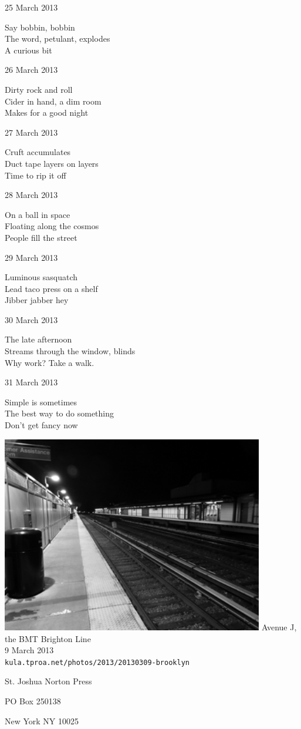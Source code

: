 \documentclass[12pt]{article}
\begin{document}
25 March 2013

Say bobbin, bobbin \\
The word, petulant, explodes \\
A curious bit

26 March 2013

Dirty rock and roll \\
Cider in hand, a dim room \\
Makes for a good night

27 March 2013

Cruft accumulates \\
Duct tape layers on layers \\
Time to rip it off

28 March 2013

On a ball in space \\
Floating along the cosmos \\
People fill the street

29 March 2013

Luminous sasquatch \\
Lead taco press on a shelf \\
Jibber jabber hey

30 March 2013

The late afternoon \\
Streams through the window, blinds \\
Why work? Take a walk.

31 March 2013

Simple is sometimes \\
The best way to do something \\
Don't get fancy now

\newpage

\begin{center}
\includegraphics[width=325pt]{subway.png}
Avenue J, the BMT Brighton Line \\
9 March 2013 \\
{\tt kula.tproa.net/photos/2013/20130309-brooklyn}
\end{center}

\newpage

\thispagestyle{empty}
\vspace*{12cm}
\begin{sideways}
\Large{St. Joshua Norton Press}
\end{sideways}
\begin{sideways}
\Large{PO Box 250138}
\end{sideways}
\begin{sideways}
\Large{New York NY 10025}
\end{sideways}
\end{document}
